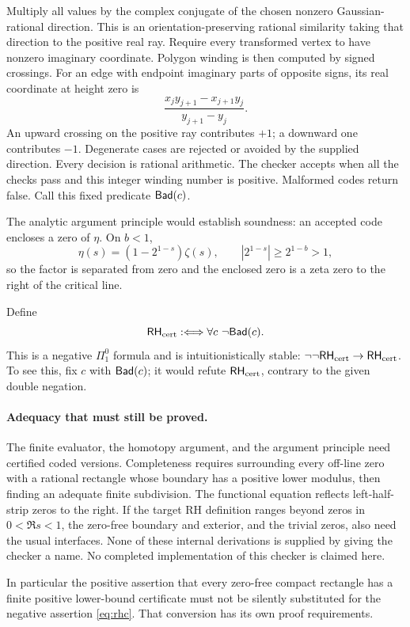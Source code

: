 Multiply all values by the complex conjugate of the chosen nonzero
Gaussian-rational direction. This is an orientation-preserving
rational similarity taking that direction to the positive real ray.
Require every transformed vertex to have nonzero imaginary coordinate.
Polygon winding is then computed by signed crossings.
For an edge with endpoint imaginary parts of opposite signs, its
real coordinate at height zero is
\[
 \frac{x_jy_{j+1}-x_{j+1}y_j}{y_{j+1}-y_j}.
\]
An upward crossing on the positive ray contributes $+1$; a downward
one contributes $-1$. Degenerate cases are rejected or avoided by
the supplied direction. Every decision is rational arithmetic.
The checker accepts when all the checks pass and this integer
winding number is positive. Malformed codes return false.
Call this fixed predicate $\mathsf{Bad}(c)$.

The analytic argument principle would establish soundness:
an accepted code encloses a zero of $\eta$. On $b<1$,
\[
 \eta(s)=(1-2^{1-s})\zeta(s),\qquad
 |2^{1-s}|\ge2^{1-b}>1,
\]
so the factor is separated from zero and the enclosed zero is a
zeta zero to the right of the critical line.

Define
\begin{equation}\label{eq:rhc}
 \mathsf{RH}_{\rm cert}:\Longleftrightarrow \forall c\ \neg\mathsf{Bad}(c).
\end{equation}
This is a negative $\Pi^0_1$ formula and is intuitionistically stable:
$\neg\neg\mathsf{RH}_{\rm cert}\to\mathsf{RH}_{\rm cert}$. To see this, fix $c$ with $\mathsf{Bad}(c)$; it
would refute $\mathsf{RH}_{\rm cert}$, contrary to the given double negation.

\paragraph{Adequacy that must still be proved.}
The finite evaluator, the homotopy argument, and the argument principle
need certified coded versions. Completeness requires surrounding every
off-line zero with a rational rectangle whose boundary has a positive
lower modulus, then finding an adequate finite subdivision. The functional
equation reflects left-half-strip zeros to the right. If the target RH
definition ranges beyond zeros in $0<\Re s<1$, the zero-free boundary
and exterior, and the trivial zeros, also need the usual interfaces.
None of these internal derivations is supplied by giving the checker
a name. No completed implementation of this checker is claimed here.

In particular the positive assertion that every zero-free compact
rectangle has a finite positive lower-bound certificate must not be
silently substituted for the negative assertion \eqref{eq:rhc}.
That conversion has its own proof requirements.

